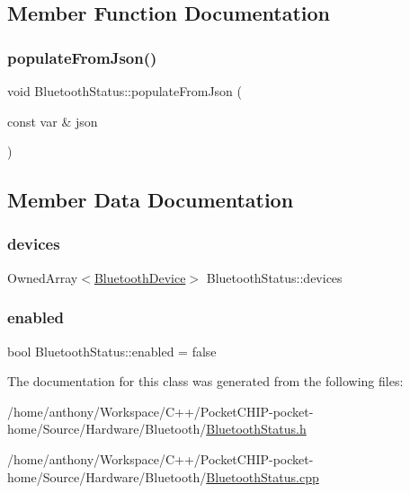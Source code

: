 \subsection{Member Function Documentation}
\mbox{\label{classBluetoothStatus_ae3cf682d24f5adf760e03f3169ddacea}} 
\subsubsection{\texorpdfstring{populate\+From\+Json()}{populateFromJson()}}
{\footnotesize\ttfamily void Bluetooth\+Status\+::populate\+From\+Json (\begin{DoxyParamCaption}\item[{const var \&}]{json }\end{DoxyParamCaption})}



\subsection{Member Data Documentation}
\mbox{\label{classBluetoothStatus_a64a256084edf2aa6526f71a5b2e5a0a8}} 
\subsubsection{\texorpdfstring{devices}{devices}}
{\footnotesize\ttfamily Owned\+Array$<$\mbox{\hyperlink{classBluetoothDevice}{Bluetooth\+Device}}$>$ Bluetooth\+Status\+::devices}

\mbox{\label{classBluetoothStatus_a8d00a127b71ffc93e953072c251d5592}} 
\subsubsection{\texorpdfstring{enabled}{enabled}}
{\footnotesize\ttfamily bool Bluetooth\+Status\+::enabled = false}



The documentation for this class was generated from the following files\+:\begin{DoxyCompactItemize}
\item 
/home/anthony/\+Workspace/\+C++/\+Pocket\+C\+H\+I\+P-\/pocket-\/home/\+Source/\+Hardware/\+Bluetooth/\mbox{\hyperlink{BluetoothStatus_8h}{Bluetooth\+Status.\+h}}\item 
/home/anthony/\+Workspace/\+C++/\+Pocket\+C\+H\+I\+P-\/pocket-\/home/\+Source/\+Hardware/\+Bluetooth/\mbox{\hyperlink{BluetoothStatus_8cpp}{Bluetooth\+Status.\+cpp}}\end{DoxyCompactItemize}
